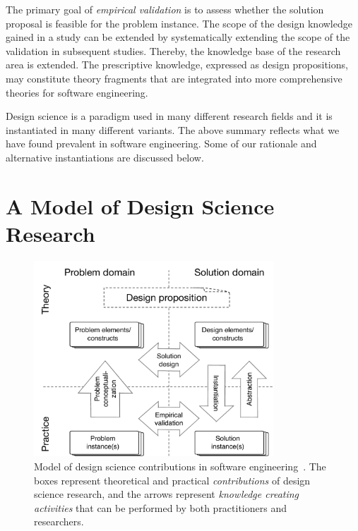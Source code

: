 \documentclass[graybox]{svmult}
\begin{document}
 The primary goal of \emph{empirical validation} is to assess whether the solution proposal is feasible for the problem instance. The scope of the design knowledge gained in a study can be extended by systematically extending the scope of the validation in subsequent studies. Thereby, the knowledge base of the research area is extended. The prescriptive knowledge, expressed as design propositions, may constitute theory fragments that are integrated into more comprehensive theories for software engineering. 


Design science is a paradigm used in many different research fields and it is instantiated in many different variants. The above summary reflects what we have found prevalent in software engineering. Some of our rationale and alternative instantiations are discussed below.



\section{A Model of Design Science Research}
\label{sec:DesignScienceResearch}


\begin{figure}[t]
\centering
 \includegraphics[width=0.8\textwidth]{Figures/DS_model.pdf}
\caption{Model of design science contributions in software engineering~\cite{Engstrom19arxiv}. The boxes represent theoretical and practical \emph{contributions} of design science research, and the arrows represent \emph{knowledge creating activities} that can be performed by both practitioners and researchers.}
\label{fig:DS_model}       %
\end{figure}
\end{document}

